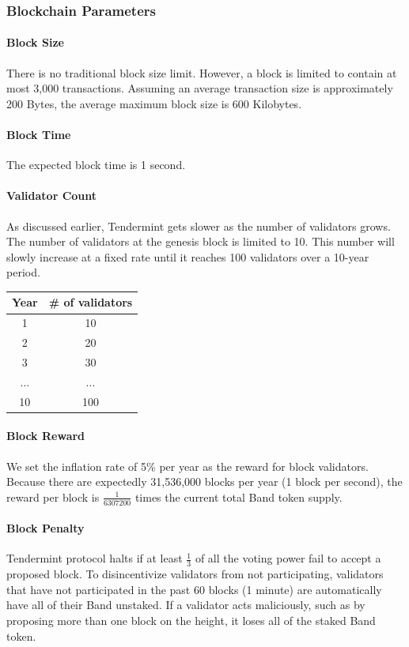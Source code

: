 \documentclass[letterpaper,11pt]{article}
\begin{document}
\subsubsection{Blockchain Parameters}
\paragraph{Block Size} There is no traditional block size limit. However, a block is limited to contain at most 3,000 transactions. Assuming an average transaction size is approximately 200 Bytes, the average maximum block size is 600 Kilobytes.

\paragraph{Block Time} The expected block time is 1 second. 

\paragraph{Validator Count} As discussed earlier, Tendermint gets slower as the number of validators grows. The number of validators at the genesis block is limited to 10. This number will slowly increase at a fixed rate until it reaches 100 validators over a 10-year period. 

\begin{center}
\begin{tabular}{ c | c }
Year & \# of validators \\ \hline 
1 & 10 \\  
2 & 20 \\  
3 & 30 \\  
... & ... \\  
10 & 100 \\  
\end{tabular}
\end{center}

\paragraph{Block Reward} We set the inflation rate of 5\% per year as the reward for block validators. Because there are expectedly 31,536,000 blocks per year (1 block per second), the reward per block is $\frac{1}{6307200}$ times the current total Band token supply.

\paragraph{Block Penalty} Tendermint protocol halts if at least $\frac{1}{3}$ of all the voting power fail to accept a proposed block. To disincentivize validators from not participating, validators that have not participated in the past 60 blocks (1 minute) are automatically have all of their Band unstaked. If a validator acts maliciously, such as by proposing more than one block on the height,  it loses all of the staked Band token.
\end{document}

